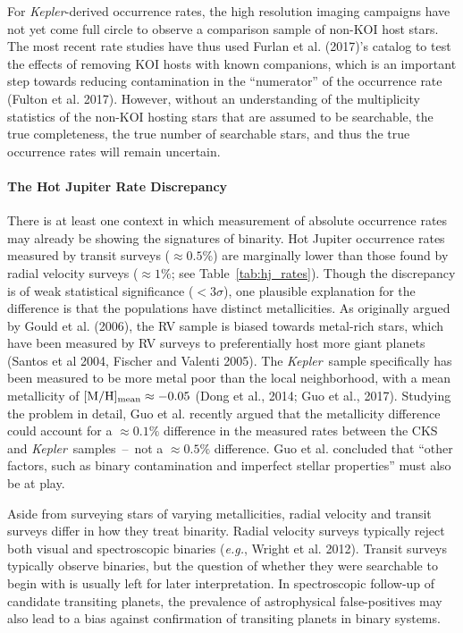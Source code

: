 For {\it Kepler}-derived occurrence rates, the high resolution imaging 
campaigns have not yet come full circle to observe a comparison sample of 
non-KOI host stars.
The most recent rate studies have thus used Furlan et al. (2017)'s 
catalog to test the effects of removing KOI hosts with known companions, which 
is an important step towards reducing contamination in the ``numerator'' of 
the occurrence rate (Fulton et al. 2017).
However, without an understanding of the multiplicity statistics of the 
non-KOI hosting stars that are assumed to be searchable, the 
true completeness, the true number of searchable stars, and thus the true 
occurrence rates will remain uncertain.


\paragraph{The Hot Jupiter Rate Discrepancy}
There is at least one context in which measurement of absolute 
occurrence rates may already be showing the signatures of binarity.
Hot Jupiter occurrence rates measured by transit surveys ($\approx 0.5\%$) are 
marginally lower than those found by radial velocity surveys ($\approx 1\%$; 
see Table~\ref{tab:hj_rates}).
Though the discrepancy is of weak statistical significance ($<3\sigma$),
one plausible explanation for the difference is that the populations have 
distinct metallicities.
As originally argued by Gould et al. (2006), the RV sample is biased towards 
metal-rich stars, which have been measured by RV surveys to preferentially 
host more giant planets (Santos et al 2004, Fischer and Valenti 2005).
The {\it Kepler}\ sample specifically has been measured to be more metal poor 
than the local neighborhood, with a mean metallicity of $[{\rm M/H}]_{\rm 
mean}\approx -0.05$ (Dong et al., 2014; Guo et al., 2017).
Studying the problem in detail, Guo et al. recently argued that the 
metallicity difference could account for a $\approx 0.1\%$ difference in the 
measured rates between the CKS and {\it Kepler}\ samples~--~not a $\approx 
0.5\%$ difference.
Guo et al. concluded that ``other factors, such as binary contamination and 
imperfect stellar properties'' must also be at play.

Aside from surveying stars of varying metallicities, radial velocity and 
transit surveys differ in how they treat binarity.
Radial velocity surveys typically reject both visual and spectroscopic binaries
({\it e.g.}, Wright et al. 2012).
Transit surveys typically observe binaries, but the question of whether they 
were searchable to begin with is usually left for later interpretation.
In spectroscopic follow-up of candidate transiting planets, the prevalence of 
astrophysical false-positives may also lead to a bias against confirmation of 
transiting planets in binary systems.

